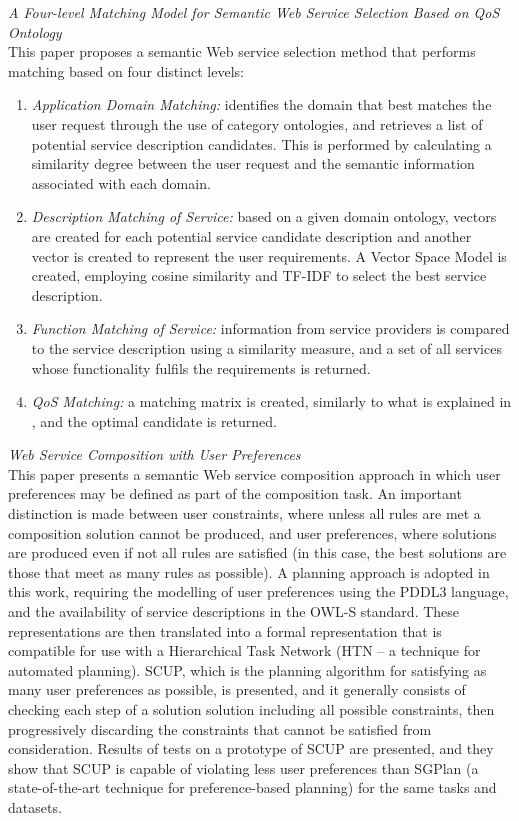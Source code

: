 \textit{A Four-level Matching Model for Semantic Web Service Selection Based on QoS Ontology \cite{guo2010four}}\\
This paper proposes a semantic Web service selection method that performs matching based on four distinct levels:
\begin{enumerate}
 \item \textit{Application Domain Matching:} identifies the domain that best matches the user request through the use of category ontologies, and retrieves a list of potential service description candidates. This is performed by calculating a similarity degree between the user request and the semantic information associated with each domain.
 \item \textit{Description Matching of Service:} based on a given domain ontology, vectors are created for each potential service candidate description and another vector is created to represent the user requirements. A Vector Space Model is created, employing cosine similarity and TF-IDF to select the best service description.
 \item \textit{Function Matching of Service:} information from service providers is compared to the service description using a similarity measure, and a set of all services whose functionality fulfils the requirements is returned.
 \item \textit{QoS Matching:} a matching matrix is created, similarly to what is explained in \cite{wang2006qos}, and the optimal candidate is returned.
\end{enumerate}

\textit{Web Service Composition with User Preferences \cite{lin2008web}}\\
This paper presents a semantic Web service composition approach in which user preferences may be defined as part of the composition
task. An important distinction is made between user constraints, where unless all rules are met a composition solution cannot be produced,
and user preferences, where solutions are produced even if not all rules are satisfied (in this case, the best solutions are those that
meet as many rules as possible). A planning approach is adopted in this work, requiring the modelling of user preferences using the PDDL3
language, and the availability of service descriptions in the OWL-S standard. These representations are then translated into a formal
representation that is compatible for use with a Hierarchical Task Network (HTN -- a technique for automated planning). SCUP, which is the planning
algorithm for satisfying as many user preferences as possible, is presented, and it generally consists of checking each step of a solution
solution including all possible constraints, then progressively discarding the constraints that cannot be satisfied from consideration.
Results of tests on a prototype of SCUP are presented, and they show that SCUP is capable of violating less user preferences than SGPlan
(a state-of-the-art technique for preference-based planning) for the same tasks and datasets.

